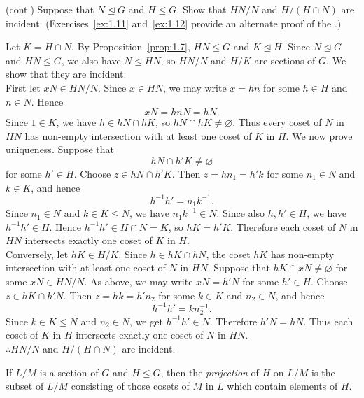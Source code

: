 \documentclass[../Odyssey_Project.tex]{subfiles}
\begin{document}
\begin{exercise}
\label{ex:1.12}
(cont.) Suppose that $N \trianglelefteq G$ and $H \leq G$. Show that $HN/N$ and $H/(H \cap N)$ are incident. (Exercises~\ref{ex:1.11} and~\ref{ex:1.12} provide an alternate proof of the .)
\end{exercise}
\begin{solution}
Let \(K = H \cap N\). By Proposition~\ref{prop:1.7}, \(HN \leq G\) and \(K \trianglelefteq H\). Since \(N \trianglelefteq G\) and \(HN \leq G\), we also have \(N \trianglelefteq HN\), so \(HN/N\) and \(H/K\) are sections of \(G\). We show that they are incident. \\
First let \(xN \in HN/N\). Since \(x \in HN\), we may write \(x=hn\) for some \(h \in H\) and \(n \in N\). Hence
\[
    xN = hnN = hN.
\]
Since \(1 \in K\), we have \(h \in hN \cap hK\), so \(hN \cap hK \neq \varnothing\). Thus every coset of \(N\) in \(HN\) has non-empty intersection with at least one coset of \(K\) in \(H\). We now prove uniqueness. Suppose that
\[
    hN \cap h'K \neq \varnothing
\]
for some \(h' \in H\). Choose \(z \in hN \cap h'K\). Then \(z=hn_1=h'k\) for some \(n_1 \in N\) and \(k \in K\), and hence
\[
    h^{-1}h' = n_1k^{-1}.
\]
Since \(n_1 \in N\) and \(k \in K \leq N\), we have \(n_1k^{-1} \in N\). Since also \(h,h' \in H\), we have \(h^{-1}h' \in H\). Hence \(h^{-1}h' \in H \cap N = K\), so \(hK=h'K\). Therefore each coset of \(N\) in \(HN\) intersects exactly one coset of \(K\) in \(H\). \\
Conversely, let \(hK \in H/K\). Since \(h \in hK \cap hN\), the coset \(hK\) has non-empty intersection with at least one coset of \(N\) in \(HN\). Suppose that \(hK \cap xN \neq \varnothing\) for some \(xN \in HN/N\). As above, we may write \(xN=h'N\) for some \(h' \in H\). Choose \(z \in hK \cap h'N\). Then \(z=hk=h'n_2\) for some \(k \in K\) and \(n_2 \in N\), and hence
\[
    h^{-1}h' = kn_2^{-1}.
\]
Since \(k \in K \leq N\) and \(n_2 \in N\), we get \(h^{-1}h' \in N\). Therefore \(h'N=hN\). Thus each coset of \(K\) in \(H\) intersects exactly one coset of \(N\) in \(HN\). \\
\(\therefore HN/N\) and \(H/(H \cap N)\) are incident.
\end{solution}

\noindent If $L/M$ is a section of $G$ and $H \leq G$, then the \emph{projection} of $H$ on $L/M$ is the subset of $L/M$ consisting of those cosets of $M$ in $L$ which contain elements of $H$.
\end{document}
